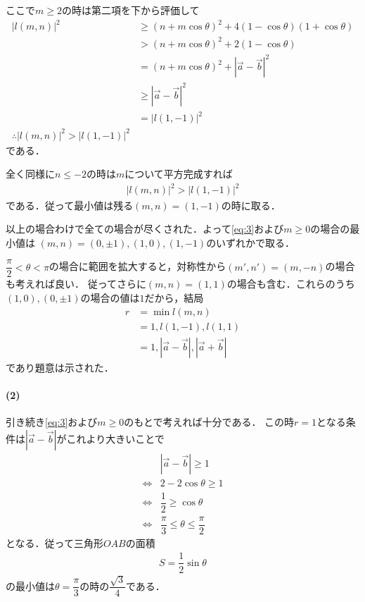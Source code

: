 \documentclass[../../main.tex]{subfiles}
\begin{document}
ここで$m\ge 2$の時は第二項を下から評価して
\begin{align}
  |l(m,n)|^2
  &\ge \left(n+m\cos\theta\right)^2 + 4\left(1-\cos\theta\right)\left(1+\cos\theta\right) \\
  & >  \left(n+m\cos\theta\right)^2 + 2\left(1-\cos\theta\right) \\
  & =  \left(n+m\cos\theta\right)^2 + \left|\vec{a}-\vec{b}\right|^2 \\
  & \ge \left|\vec{a}-\vec{b}\right|^2 \\
  & = |l(1,-1)|^2 \\
  \therefore
  |l(m,n)|^2 > |l(1,-1)|^2 \label{eq:7}
\end{align}
である．

全く同様に$n \le -2$の時は$m$について平方完成すれば
\begin{align}
  |l(m,n)|^2 > |l(1,-1)|^2 \label{eq:8}
\end{align}
である．従って最小値は残る$(m,n)=(1,-1)$の時に取る．
\casesend

以上の場合わけで全ての場合が尽くされた．よって\cref{eq:3}および$m\ge 0$の場合の最小値は
$(m,n)=(0,\pm 1),(1,0),(1,-1)$のいずれかで取る．

$\dfrac{\pi}{2}<\theta<\pi$の場合に範囲を拡大すると，対称性から$(m',n')=(m,-n)$の場合も考えれば良い．
従ってさらに$(m,n)=(1,1)$の場合も含む．これらのうち$(1,0), (0,\pm 1)$の場合の値は$1$だから，結局
\begin{align}
  r & = \min l(m,n) \\
  & = 1, l(1,-1), l(1,1) \\
  & = 1, |\vec{a}-\vec{b}|, |\vec{a}+\vec{b}|
\end{align}
であり題意は示された．

\paragraph{(2)}

引き続き\cref{eq:3}および$m\ge 0$のもとで考えれば十分である．
この時$r=1$となる条件は$|\vec{a}-\vec{b}|$がこれより大きいことで
\begin{align}
  & |\vec a-\vec b|\ge1 \\
  \iff
  & 2-2\cos\theta\ge1 \\
  \iff
  & \dfrac{1}{2} \ge \cos\theta \\
  \iff
  & \dfrac{\pi}{3}\le\theta\le\dfrac{\pi}{2} \label{eq:9}
\end{align}
となる．従って三角形$OAB$の面積
\begin{align}
  S = \dfrac{1}{2}\sin\theta
\end{align}
の最小値は$\theta=\dfrac{\pi}{3}$の時の$\dfrac{\sqrt{3}}{4}$である．

\newpage
\end{document}
